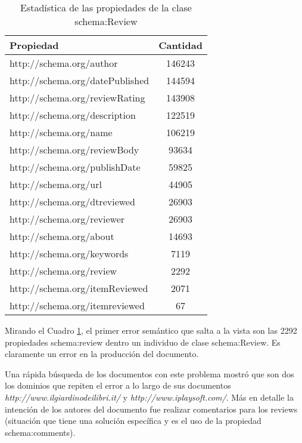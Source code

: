 \begin{table}[h]
\begin{tabular}{| l | c | }\hline
 Propiedad & Cantidad \\\hline
 http://schema.org/author & 146243 \\
 http://schema.org/datePublished & 144594 \\
 http://schema.org/reviewRating & 143908 \\
 http://schema.org/description & 122519 \\
 http://schema.org/name & 106219 \\
 http://schema.org/reviewBody & 93634 \\
 http://schema.org/publishDate & 59825 \\
 http://schema.org/url & 44905 \\
 http://schema.org/dtreviewed & 26903 \\
 http://schema.org/reviewer & 26903 \\
 http://schema.org/about & 14693 \\
 http://schema.org/keywords & 7119 \\
 http://schema.org/review & 2292 \\
 http://schema.org/itemReviewed & 2071 \\
 http://schema.org/itemreviewed & 67 \\\hline
\end{tabular}
\caption{Estadística de las propiedades de la clase schema:Review}
\label{table:PropertiesStatisticsSchema}
\end{table}

 \noindent Mirando el Cuadro \ref{table:PropertiesStatisticsSchema}, el primer error semántico que salta a la vista son las 2292 propiedades schema:review dentro un individuo de clase schema:Review. 
 Es claramente un error en la producción del documento. 
 
 Una rápida búsqueda de los documentos con este problema mostró que son dos los dominios que repiten el error a lo largo de sus documentos
 \\\noindent\textit{http://www.ilgiardinodeilibri.it/} y \textit{http://www.iplaysoft.com/}.
 Más en detalle la intención de los autores del documento fue realizar comentarios para los reviews (situación que tiene una solución específica 
 y es el uso de la propiedad schema:comments). 
 
